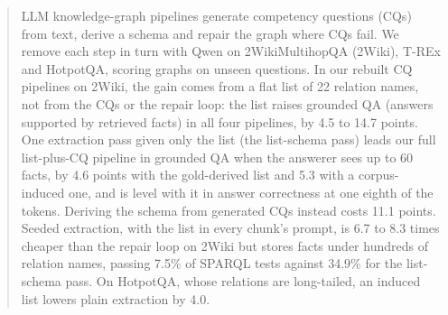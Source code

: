 \begin{abstract}
LLM knowledge-graph pipelines generate competency questions (CQs) from text, derive a schema and repair the graph where CQs fail. We remove each step in turn with Qwen on 2WikiMultihopQA (2Wiki), T-REx and HotpotQA, scoring graphs on unseen questions. In our rebuilt CQ pipelines on 2Wiki, the gain comes from a flat list of 22 relation names, not from the CQs or the repair loop: the list raises grounded QA (answers supported by retrieved facts) in all four pipelines, by 4.5 to 14.7 points. One extraction pass given only the list (the list-schema pass) leads our full list-plus-CQ pipeline in grounded QA when the answerer sees up to 60 facts, by 4.6 points with the gold-derived list and 5.3 with a corpus-induced one, and is level with it in answer correctness at one eighth of the tokens. Deriving the schema from generated CQs instead costs 11.1 points. Seeded extraction, with the list in every chunk's prompt, is 6.7 to 8.3 times cheaper than the repair loop on 2Wiki but stores facts under hundreds of relation names, passing 7.5\% of SPARQL tests against 34.9\% for the list-schema pass. On HotpotQA, whose relations are long-tailed, an induced list lowers plain extraction by 4.0.
\end{abstract}
